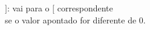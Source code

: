 \documentclass[preview]{standalone}
\begin{document}
$]$: vai para o $[$ correspondente\\se o valor apontado for diferente de 0.\\
\end{document}
